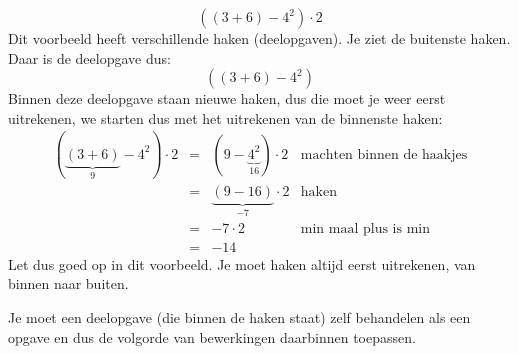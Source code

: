 
\begin{voorbeeld}
\begin{equation*}
((3+6)-4^2)\cdot 2
\end{equation*}
Dit voorbeeld heeft verschillende haken (deelopgaven). Je ziet de buitenste haken. Daar is de deelopgave dus:
\begin{equation*}
((3+6)-4^2)
\end{equation*}
Binnen deze deelopgave staan nieuwe haken, dus die moet je weer eerst uitrekenen, we starten dus met het uitrekenen van de binnenste haken:
\begin{equation*}
\begin{array}{cclr}
\left( \underbrace{(3+6)}_{9}-4^2\right)\cdot 2 &=& \left( 9-\underbrace{4^2}_{16}\right)\cdot 2 & \text{machten binnen de haakjes} \\
&=& \underbrace{(9-16)}_{-7}\cdot 2 & \text{haken} \\
&=& -7 \cdot 2 & \text{min maal plus is min} \\
&=& -14
\end{array}
\end{equation*}
Let dus goed op in dit voorbeeld. Je moet haken altijd eerst uitrekenen, van binnen naar buiten.

Je moet een deelopgave (die binnen de haken staat) zelf behandelen als een opgave en dus de volgorde van bewerkingen daarbinnen toepassen.

\end{voorbeeld}
